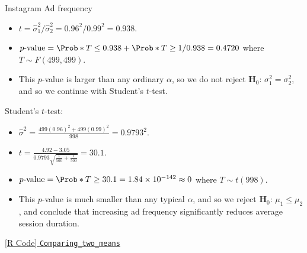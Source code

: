 \begin{Example}{Instagram Ad frequency}{}
\begin{framed}
\begin{itemize}
            \item $ t=\hat{\sigma}_1^2/\hat{\sigma}_2^2=0.96^2/0.99^2=0.938 $.
            \item $ p\text{-value}=\Prob*{T\le 0.938}+\Prob*{T\ge 1/0.938}=0.4720 $
                  where $ T \sim F(499,499) $.
            \item This $ p $-value is larger than any ordinary $ \alpha $, so
                  we do not reject $ \mathbf{H}_0 $: $ \sigma_1^2=\sigma_2^2 $, and so we continue
                  with Student's $ t $-test.
        \end{itemize}
    \end{framed}
    \begin{framed}
        Student's $ t $-test:
        \begin{itemize}
            \item $ \displaystyle \hat{\sigma}^2=\frac{499(0.96)^2+499(0.99)^2}{998}=0.9793^2 $.
            \item $ \displaystyle t=\frac{4.92-3.05}{0.9793\sqrt{\frac{1}{500} +\frac{1}{500} }}=30.1  $.
            \item $ p\text{-value}=\Prob*{T\ge 30.1}=1.84\times 10^{-142}\approx 0 $ where $ T \sim t(998) $.
            \item This $ p $-value is much smaller than any typical $ \alpha $, and so we reject
                  $ \mathbf{H}_0 $: $ \mu_1\le \mu_2 $, and conclude that increasing ad frequency significantly
                  reduces average session duration.
        \end{itemize}
    \end{framed}
    \href{https://github.com/Hextical/university-notes/blob/master/year-3/semester-3/STAT 430/code/W2/Comparing_two_means.R}{[R Code] \texttt{Comparing\_two\_means}}
\end{Example}
